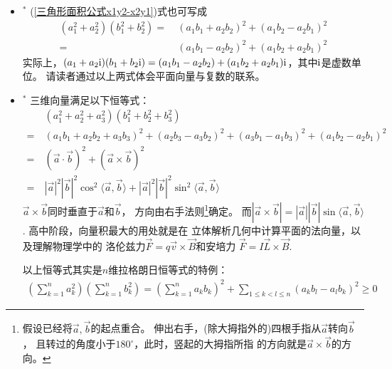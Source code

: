 \begin{itemize}[leftmargin=\inteval{\myitemleftmargin}pt,itemsep=
   \inteval{\myitemitempsep}pt,topsep=\inteval{\myitemtopsep}pt]
\item $^*$ (\ref{三角形面积公式x1y2-x2y1})式也可写成
\begin{align} 
    (a_1^2+a_2^2)(b_1^2+b_2^2)=&\  (a_1b_1+a_2b_2)^2+
    (a_1b_2-a_2b_1)^2 \\
    =&\  (a_1b_1-a_2b_2)^2+(a_1b_2+a_2b_1)^2 
\end{align}
实际上，$ (a_1+a_2 \mathrm{i})(b_1+b_2 \mathrm{i})=(a_1b_1-a_2b_2)+(a_1b_2+
a_2b_1)\mathrm{i} $，其中$ \mathrm{i} $是虚数单位。
请读者通过以上两式体会平面向量与复数的联系。

\item $^*$ 三维向量满足以下恒等式：
\begin{align*}
    &\ (a_1^2+a_2^2+a_3^2)(b_1^2+b_2^2+b_3^2)\\
    =&\  (a_1b_1+a_2b_2+a_3b_3)^2+
    (a_2b_3-a_3b_2)^2+(a_3b_1-a_1b_3)^2+(a_1b_2-a_2b_1)^2 \\
    =&\ (\vec{a}\cdot \vec{b})^2+(\vec{a}\times\vec{b})^2 \\
    =&\ |\vec{a}|^2|\vec{b}|^2\cos^2\langle\vec{a},\vec{b}\rangle 
    +|\vec{a}|^2|\vec{b}|^2\sin^2\langle\vec{a},\vec{b}\rangle
\end{align*} 
$ \vec{a}\times\vec{b} $同时垂直于$ \vec{a} $和$ \vec{b} $，
方向由右手法则\footnote{
    假设已经将$ \vec{a},\vec{b} $的起点重合。
    伸出右手，(除大拇指外的)四根手指从$ \vec{a} $转向$ \vec{b} $，
    且转过的角度小于$ 180^{\circ} $，此时，竖起的大拇指所指
    的方向就是$ \vec{a}\times\vec{b} $的方向。}确定。
而$ |\vec{a}\times\vec{b}|=|\vec{a}||\vec{b}|\sin\langle\vec{a},
\vec{b}\rangle $. 高中阶段，向量积最大的用处就是在
立体解析几何中计算平面的法向量，以及理解物理学中的
洛伦兹力$ \vec{F}=q\vec{v}\times \vec{B} $和安培力
$ \vec{F}=I\vec{L}\times \vec{B} $. 

以上恒等式其实是$ n $维拉格朗日恒等式的特例：
\begin{gather}\label{拉格朗日恒等式}
    \left(\sum_{k=1}^{n}a_k^2 \right) \left(\sum_{k=1}^{n}b_k^2 \right)=\left( 
    \sum_{k=1}^{n}a_kb_k\right)^2 +\sum_{1\leq k<l\leq n }\left( 
    a_kb_l-a_lb_k\right)^2 \geq 0  
\end{gather}


\end{itemize}

